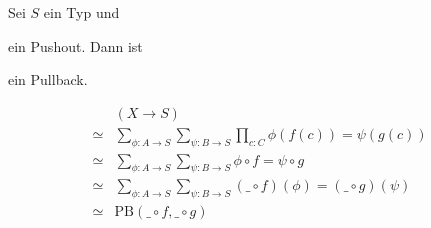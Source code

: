 \begin{lemma}
  Sei $S$ ein Typ und
  \begin{center}
  \end{center}
  ein Pushout. Dann ist
  \begin{center}
  \end{center}
  ein Pullback.
\end{lemma}
\begin{beweis}
  \begin{align*}
    &(X\to S) \\
    \simeq &\sum_{\phi:A\to S}\sum_{\psi:B\to S}\prod_{c:C}\phi(f(c))=\psi(g(c)) \\
    \simeq &\sum_{\phi:A\to S}\sum_{\psi:B\to S}\phi \circ f=\psi \circ g \\
    \simeq &\sum_{\phi:A\to S}\sum_{\psi:B\to S}(\_\circ f)(\phi)=(\_ \circ g)(\psi) \\
    \simeq &\mathrm{PB}(\_\circ f,\_ \circ g)
  \end{align*}
\end{beweis}

